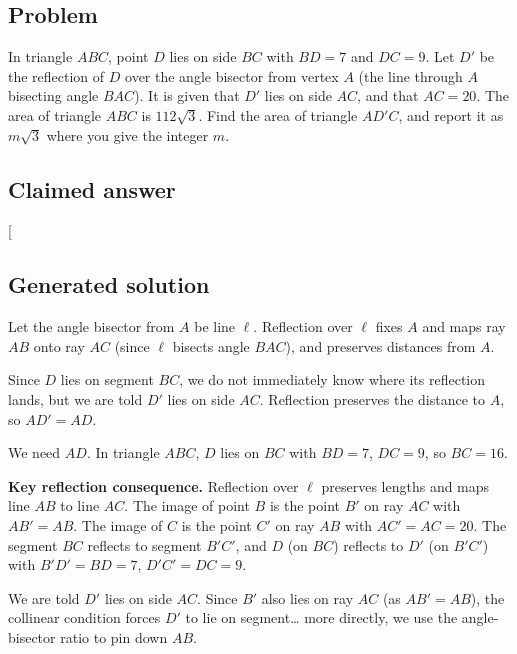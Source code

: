\documentclass[
  11pt,
  letterpaper,
]{article}
\begin{document}
\subsection{Problem}\label{problem-14}

In triangle \(ABC\), point \(D\) lies on side \(BC\) with \(BD = 7\) and
\(DC = 9\). Let \(D'\) be the reflection of \(D\) over the angle
bisector from vertex \(A\) (the line through \(A\) bisecting angle
\(BAC\)). It is given that \(D'\) lies on side \(AC\), and that
\(AC = 20\). The area of triangle \(ABC\) is \(112\sqrt{3}\). Find the
area of triangle \(AD'C\), and report it as \(m\sqrt{3}\) where you give
the integer \(m\).

\subsection{Claimed answer}\label{claimed-answer-14}

{[}\boxed{63}{]}

\subsection{Generated solution}\label{generated-solution-14}

Let the angle bisector from \(A\) be line \(\ell\). Reflection over
\(\ell\) fixes \(A\) and maps ray \(AB\) onto ray \(AC\) (since \(\ell\)
bisects angle \(BAC\)), and preserves distances from \(A\).

Since \(D\) lies on segment \(BC\), we do not immediately know where its
reflection lands, but we are told \(D'\) lies on side \(AC\). Reflection
preserves the distance to \(A\), so \(AD' = AD\).

We need \(AD\). In triangle \(ABC\), \(D\) lies on \(BC\) with
\(BD = 7\), \(DC = 9\), so \(BC = 16\).

\textbf{Key reflection consequence.} Reflection over \(\ell\) preserves
lengths and maps line \(AB\) to line \(AC\). The image of point \(B\) is
the point \(B'\) on ray \(AC\) with \(AB' = AB\). The image of \(C\) is
the point \(C'\) on ray \(AB\) with \(AC' = AC = 20\). The segment
\(BC\) reflects to segment \(B'C'\), and \(D\) (on \(BC\)) reflects to
\(D'\) (on \(B'C'\)) with \(B'D' = BD = 7\), \(D'C' = DC = 9\).

We are told \(D'\) lies on side \(AC\). Since \(B'\) also lies on ray
\(AC\) (as \(AB' = AB\)), the collinear condition forces \(D'\) to lie
on segment\ldots{} more directly, we use the angle-bisector ratio to pin
down \(AB\).
\end{document}
